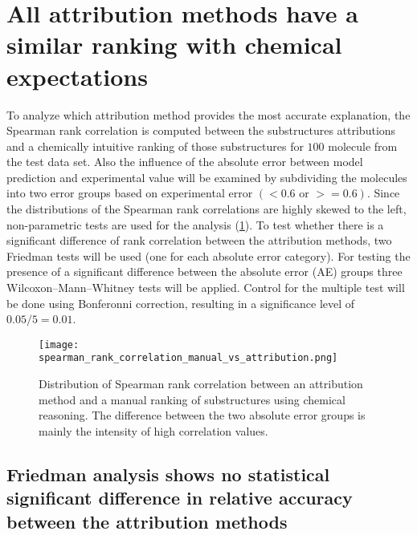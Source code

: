 \section{All attribution methods have a similar ranking with chemical expectations}



To analyze which attribution method provides the most accurate
explanation, the Spearman rank correlation is computed between the
substructures attributions and a chemically intuitive ranking of those
substructures for $100$ molecule from the test data set. Also the influence of the absolute error between model
prediction and experimental value will be examined by subdividing the
molecules into two error groups based on experimental error $(<0.6 \text{ or } >=0.6)$. Since the distributions of
the Spearman rank correlations are highly skewed to the left,
non-parametric tests are used for the analysis (\cref{fig:spearman_corr_manual}). To test whether there is
a significant difference of rank correlation between the attribution
methods, two Friedman tests will be used (one for each absolute error
category). For testing the presence of a significant difference between
the absolute error (AE) groups three Wilcoxon--Mann--Whitney tests will be applied.
Control for the multiple test will be done using Bonferonni correction, 
resulting in a significance level of $0.05/5 = 0.01$.


\begin{figure}[h]
    \centering
    \texttt{[image: spearman\_rank\_correlation\_manual\_vs\_attribution.png]}
    \caption{Distribution of Spearman rank correlation between an attribution method 
        and a manual ranking of substructures using chemical reasoning. The difference 
        between the two absolute error groups is mainly the intensity of high 
        correlation values.
    }
    \label{fig:spearman_corr_manual}
\end{figure}


\subsection{Friedman analysis shows no statistical significant difference in relative accuracy between the attribution methods}


